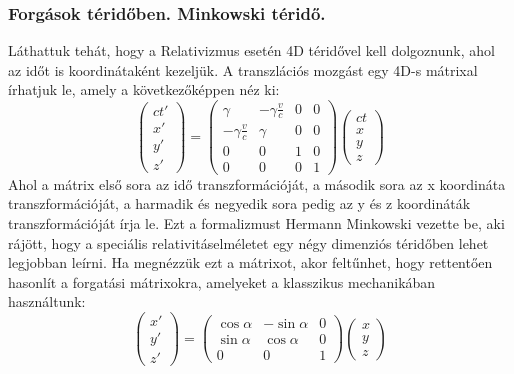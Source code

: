 \documentclass[../main.tex]{subfiles}
\begin{document}
\subsubsection*{Forgások téridőben. Minkowski téridő.}
Láthattuk tehát, hogy a Relativizmus esetén 4D téridővel kell dolgoznunk, ahol az időt is koordinátaként kezeljük.  
A transzlációs mozgást egy 4D-s mátrixal írhatjuk le, amely a következőképpen néz ki:
\begin{equation}
    \begin{pmatrix}
        ct' \\
        x' \\
        y' \\
        z'
    \end{pmatrix} =
    \begin{pmatrix}
        \gamma & -\gamma \frac{v}{c} & 0 & 0 \\
        -\gamma \frac{v}{c} & \gamma & 0 & 0 \\
        0 & 0 & 1 & 0 \\
        0 & 0 & 0 & 1
    \end{pmatrix}
    \begin{pmatrix}
        ct \\
        x \\
        y \\
        z
    \end{pmatrix}
\end{equation}
Ahol a mátrix első sora az idő transzformációját, a második sora az x koordináta transzformációját, a harmadik és negyedik sora pedig az y és z koordináták transzformációját írja le.
Ezt a formalizmust Hermann Minkowski vezette be, aki rájött, hogy a speciális relativitáselméletet egy négy dimenziós téridőben lehet legjobban leírni. Ha megnézzük ezt a mátrixot,
akor feltűnhet, hogy rettentően hasonlít a forgatási mátrixokra, amelyeket a klasszikus mechanikában használtunk:
\begin{equation}
    \begin{pmatrix}
        x' \\
        y' \\
        z'
    \end{pmatrix} =
    \begin{pmatrix}
        \cos \alpha & -\sin \alpha & 0 \\
        \sin \alpha & \cos \alpha & 0 \\
        0 & 0 & 1
    \end{pmatrix}
    \begin{pmatrix}
        x \\
        y \\
        z
    \end{pmatrix}
\end{equation}
\end{document}
